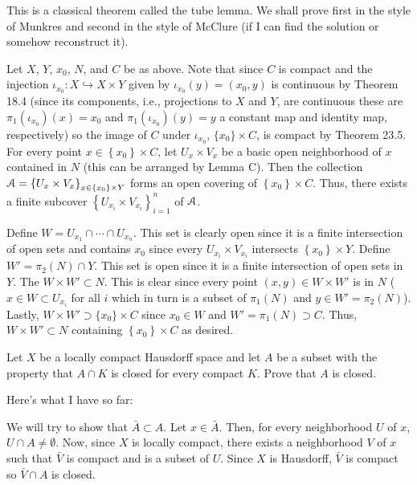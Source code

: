 \begin{solution}
  This is a classical theorem called the tube lemma. We shall prove first
  in the style of Munkres and second in the style of McClure (if I can find
  the solution or somehow reconstruct it).

  Let $X$, $Y$, $x_0$, $N$, and $C$ be as above. Note that since $C$ is
  compact and the injection $\iota_{x_0}\colon X\hookrightarrow X\times Y$
  given by $\iota_{x_0}(y)=(x_0,y)$ is continuous by Theorem 18.4 (since
  its components, i.e., projections to $X$ and $Y$, are continuous these
  are $\pi_1(\iota_{x_0})(x)=x_0$ and $\pi_1(\iota_{x_0})(y)=y$ a constant
  map and identity map, respectively) so the image of $C$ under
  $\iota_{x_0}$, $\{x_0\}\times C$, is compact by Theorem 23.5. For every
  point $x\in\left\{x_0\right\}\times C$, let $U_x\times V_x$ be a basic
  open neighborhood of $x$ contained in $N$ (this can be arranged by Lemma
  C). Then the collection
  $\mathcal{A}=\left\{U_x\times V_x\right\}_{x\in\left\{x_0\right\}\times Y}$
  forms an open covering of $\left\{x_0\right\}\times C$. Thus, there
  exists a finite subcover $\left\{U_{x_i}\times V_{x_i}\right\}_{i=1}^n$
  of $\mathcal{A}$.

  Define $W= U_{x_1}\cap\dotsb\cap U_{x_n}$. This set is clearly open since
  it is a finite intersection of open sets and contains $x_0$ since every
  $U_{x_i}\times V_{x_i}$ intersects $\left\{x_0\right\}\times Y$. Define
  $W'=\pi_2(N)\cap Y$. This set is open since it is a finite intersection
  of open sets in $Y$. The $W\times W'\subset N$. This is clear since every
  point $(x,y)\in W\times W'$ is in $N$ ($x\in W\subset U_{x_i}$ for all
  $i$ which in turn is a subset of $\pi_1(N)$ and $y\in
  W'=\pi_2(N)$). Lastly, $W\times W'\supset \{x_0\}\times C$ since
  $x_0\in W$ and $W'=\pi_1(N)\supset C$. Thus, $W\times W'\subset N$
  containing $\left\{x_0\right\}\times C$ as desired.
\end{solution}
\begin{problem}
  Let $X$ be a locally compact Hausdorff space and let $A$ be a subset with
  the property that $A\cap K$ is closed for every compact $K$. Prove that
  $A$ is closed.
\end{problem}
\begin{solution}
  Here's what I have so far:

  We will try to show that $\bar A\subset A$. Let $x\in\bar A$. Then, for
  every neighborhood $U$ of $x$, $U\cap A\neq\emptyset$. Now, since $X$ is
  locally compact, there exists a neighborhood $V$ of $x$ such that
  $\bar V$ is compact and is a subset of $U$. Since $X$ is Hausdorff,
  $\bar V$ is compact so $\bar V\cap A$ is closed.
\end{solution}
